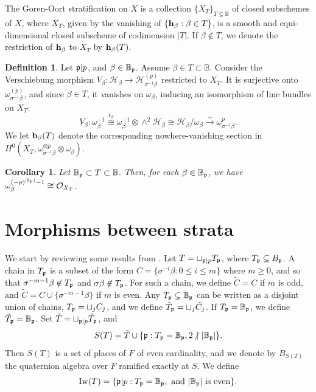 \documentclass[11pt,pdflatex]{amsart}
\theoremstyle{plain}
\theoremstyle{definition}
\theoremstyle{plain}
\newtheorem{cor}[theorem]{Corollary}
\theoremstyle{definition}
\newtheorem{dfn}[theorem]{Definition}
\theoremstyle{remark}
\numberwithin{equation}{section}
\numberwithin{figure}{section} \numberwithin{table}{subsection}
\newcommand{\gerp}{{\frak{p}}}
\newcommand{\calH}{{\mathcal{H}}}
\newcommand{\calO}{{\mathcal{O}}}
\def\BB{\mathbb{B}}
\begin{document}
The Goren-Oort stratification on $X$ is a collection $\{X_T\}_{T \subseteq \BB}$ of closed subschemes of $X$, where $X_T$, given by the vanishing of $\{{\bf h}_\beta: \beta \in T\}$, is a smooth and equi-dimensional closed subscheme of codimension $|T|$. If $\beta \not\in T$, we denote the restriction of ${\bf h}_\beta$ to $X_T$ by ${\bf h}_\beta(T)$. 

\begin{dfn}\label{dfn: b} Let $\gerp|p$, and $\beta\in \BB_\gerp$. Assume $\beta \in T \subset \BB$. Consider the Verschiebung morphism   $V_{\beta}: \calH_{\beta} \rightarrow \calH^{(p)}_{\sigma^{-1}\beta}$ restricted to $X_T$. It is surjective onto $\omega_{\sigma^{-1}\beta}^{(p)}$, and  since $\beta \in T$, it vanishes on $\omega_{\beta}$,  inducing an isomorphism of line bundles on $X_T$:
$$ V_{\beta}: \omega_{\beta}^{-1}  \overset{\epsilon_\beta}{\cong} \omega_{\beta}^{-1} \otimes  \wedge^2 \calH_\beta  \cong \calH_{\beta}/\omega_{\beta} \xrightarrow{\sim}  \omega_{\sigma^{-1}\beta}^p.
$$
We let ${\bf b}_\beta(T)$ denote  the corresponding nowhere-vanishing section in $H^0(X_T, \omega_{\sigma^{-1}\beta}^{\otimes p}\otimes \omega_\beta)$.  \end{dfn}
 
 \begin{cor}\label{cor: torsion} Let $\BB_\gerp \subset T \subset \BB$. Then, for each $\beta \in \BB_\gerp$, we have $\omega_\beta^{(-p)^{|\BB_\gerp|}-1} \cong \calO_{X_T}$.
 \end{cor}
   
\section{Morphisms between strata}\label{section: morphisms}

We start by reviewing some results from \cite{TX}. Let $T=\sqcup_{\gerp|p} T_\gerp$, where $T_\gerp \subseteq B_\gerp$.     A chain in $T_\gerp$ is a subset of the form $C=\{\sigma^{-i}\beta: 0 \leq i \leq m\}$ where $m\geq 0$, and so that $\sigma^{-m-1} \beta \not \in T_\gerp$ and $\sigma\beta \not\in T_\gerp$. For such a chain, we  define $\tilde{C}=C$ if $m$ is odd, and $\tilde{C}=C\cup\{\sigma^{-m-1} \beta\}$ if $m$ is even. Any $T_\gerp\subsetneq \BB_\gerp$ can be written as a disjoint union of chains, $T_\gerp=\sqcup_j C_j$, and we define $\tilde{T}_\gerp=\sqcup_j \tilde{C_j}$. If $T_\gerp=\BB_\gerp$, we define $\tilde{T}_\gerp=\BB_\gerp$. Set $\tilde{T}=\sqcup_{\gerp|p} \tilde{T}_\gerp$, and $$S(T)=\tilde{T}\cup \{\gerp: T_\gerp=\BB_\gerp, 2\!\not |\ |\BB_\gerp|\}.$$ Then $S(T)$ is a set of places of $F$ of even cardinality, and we denote by $B_{S(T)}$ the quaternion algebra over $F$ ramified exactly at $S$.  We define 
$${\rm Iw}(T)=\{\gerp|p: T_\gerp=\BB_\gerp,\ {\rm and}\ |\BB_\gerp|\ {\rm is\ even}\}.$$
\end{document}
